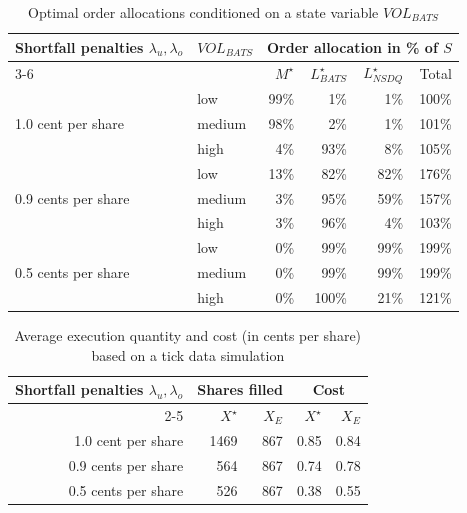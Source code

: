 \documentclass[opre,nonblindrev]{informs3}
\begin{document}
\begin{table}[!h]
\begin{center}
\begin{tabular}{|l|l|r r r r|}
\hline
\multirow{2}{*}{Shortfall penalties $\lambda_u, \lambda_o$} & \multirow{2}{*}{$VOL_{BATS}$} & \multicolumn{4}{|c|}{Order allocation in \% of $S$}\\
\cline{3-6}
 &  & $M^\star$ & $L^\star_{BATS}$ & $L^\star_{NSDQ}$ & Total\\
\hline
\multirow{3}{*}{1.0 cent per share} & low & 99\% & 1\% & 1\% & 100\%\\
 & medium & 98\% & 2\% & 1\% & 101\%\\
 & high & 4\% & 93\% & 8\% & 105\%\\
\hline
\multirow{3}{*}{0.9 cents per share} & low & 13\% & 82\% & 82\% & 176\%\\
 & medium & 3\% & 95\% & 59\% & 157\%\\
 & high & 3\% & 96\% & 4\% & 103\%\\
\hline
\multirow{3}{*}{0.5 cents per share} & low & 0\% & 99\% & 99\% & 199\%\\
 & medium & 0\% & 99\% & 99\% & 199\%\\
 & high & 0\% & 100\% & 21\% & 121\%\\
\hline
\end{tabular}
\caption{Optimal order allocations conditioned on a state variable $VOL_{BATS}$}
\end{center}
\end{table}


\begin{table}[!h]
\begin{center}
\begin{tabular}{|r|r r|r r|}
\hline
\multirow{2}{*}{Shortfall penalties $\lambda_u, \lambda_o$} & \multicolumn{2}{|c|}{Shares filled} & \multicolumn{2}{|c|}{Cost}\\
\cline{2-5}
 & $X^\star$ & $X_E$ & $X^\star$ & $X_E$\\
\hline
1.0 cent per share & 1469 & 867 & 0.85 & 0.84\\
0.9 cents per share & 564 & 867 & 0.74 & 0.78\\
0.5 cents per share & 526 & 867 & 0.38 & 0.55\\
\hline
\end{tabular}
\caption{Average execution quantity and cost (in cents per share) based on a tick data simulation}
\end{center}
\end{table}
\end{document}
